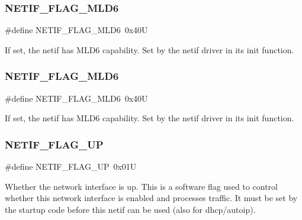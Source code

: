 \subsubsection{\texorpdfstring{N\+E\+T\+I\+F\+\_\+\+F\+L\+A\+G\+\_\+\+M\+L\+D6}{NETIF\_FLAG\_MLD6}\hspace{0.1cm}{\footnotesize\ttfamily [1/2]}}
{\footnotesize\ttfamily \#define N\+E\+T\+I\+F\+\_\+\+F\+L\+A\+G\+\_\+\+M\+L\+D6~0x40U}

If set, the netif has M\+L\+D6 capability. Set by the netif driver in its init function. \mbox{\label{group__netif__flags_gab14fbe1447d2fdbdf5abc87f51eb6508}} 
\subsubsection{\texorpdfstring{N\+E\+T\+I\+F\+\_\+\+F\+L\+A\+G\+\_\+\+M\+L\+D6}{NETIF\_FLAG\_MLD6}\hspace{0.1cm}{\footnotesize\ttfamily [2/2]}}
{\footnotesize\ttfamily \#define N\+E\+T\+I\+F\+\_\+\+F\+L\+A\+G\+\_\+\+M\+L\+D6~0x40U}

If set, the netif has M\+L\+D6 capability. Set by the netif driver in its init function. \mbox{\label{group__netif__flags_gab47d7d130693dc155f480a5bf447725e}} 
\subsubsection{\texorpdfstring{N\+E\+T\+I\+F\+\_\+\+F\+L\+A\+G\+\_\+\+UP}{NETIF\_FLAG\_UP}\hspace{0.1cm}{\footnotesize\ttfamily [1/2]}}
{\footnotesize\ttfamily \#define N\+E\+T\+I\+F\+\_\+\+F\+L\+A\+G\+\_\+\+UP~0x01U}

Whether the network interface is \textquotesingle{}up\textquotesingle{}. This is a software flag used to control whether this network interface is enabled and processes traffic. It must be set by the startup code before this netif can be used (also for dhcp/autoip). \mbox{\label{group__netif__flags_gab47d7d130693dc155f480a5bf447725e}} 
